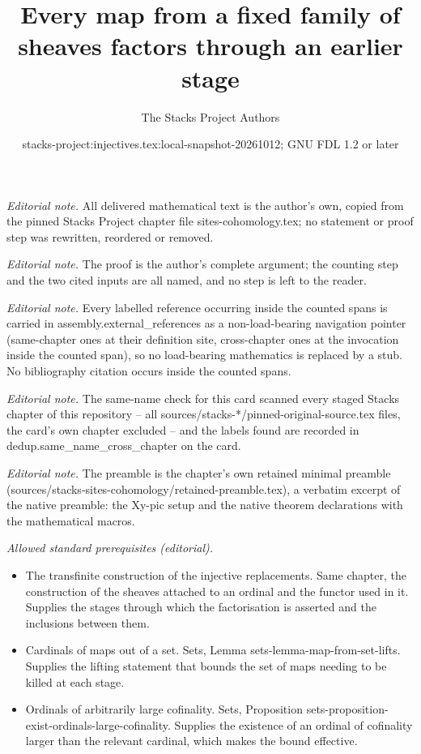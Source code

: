 \documentclass[10pt,a4paper]{amsart}
\title{Every map from a fixed family of sheaves factors through an earlier stage}
\author{The Stacks Project Authors}
\date{stacks-project:injectives.tex:local-snapshot-20261012; GNU FDL 1.2 or later}
\theoremstyle{plain}
\theoremstyle{definition}
\theoremstyle{remark}
\numberwithin{equation}{subsection}
\begin{document}
\maketitle
\noindent\textit{Editorial note.} All delivered mathematical text is the author's own, copied from the pinned Stacks Project chapter file sites-cohomology.tex; no statement or proof step was rewritten, reordered or removed.\par\medskip
\noindent\textit{Editorial note.} The proof is the author's complete argument; the counting step and the two cited inputs are all named, and no step is left to the reader.\par\medskip
\noindent\textit{Editorial note.} Every labelled reference occurring inside the counted spans is carried in assembly.external\_references as a non-load-bearing navigation pointer (same-chapter ones at their definition site, cross-chapter ones at the invocation inside the counted span), so no load-bearing mathematics is replaced by a stub. No bibliography citation occurs inside the counted spans.\par\medskip
\noindent\textit{Editorial note.} The same-name check for this card scanned every staged Stacks chapter of this repository -- all sources/stacks-*/pinned-original-source.tex files, the card's own chapter excluded -- and the labels found are recorded in dedup.same\_name\_cross\_chapter on the card.\par\medskip
\noindent\textit{Editorial note.} The preamble is the chapter's own retained minimal preamble (sources/stacks-sites-cohomology/retained-preamble.tex), a verbatim excerpt of the native preamble: the Xy-pic setup and the native theorem declarations with the mathematical macros.\par\medskip
\noindent\textit{Allowed standard prerequisites (editorial).}\begin{itemize}
\item The transfinite construction of the injective replacements. Same chapter, the construction of the sheaves attached to an ordinal and the functor used in it. Supplies the stages through which the factorisation is asserted and the inclusions between them.
\item Cardinals of maps out of a set. Sets, Lemma sets-lemma-map-from-set-lifts. Supplies the lifting statement that bounds the set of maps needing to be killed at each stage.
\item Ordinals of arbitrarily large cofinality. Sets, Proposition sets-proposition-exist-ordinals-large-cofinality. Supplies the existence of an ordinal of cofinality larger than the relevant cardinal, which makes the bound effective.
\end{itemize}\medskip
\end{document}
